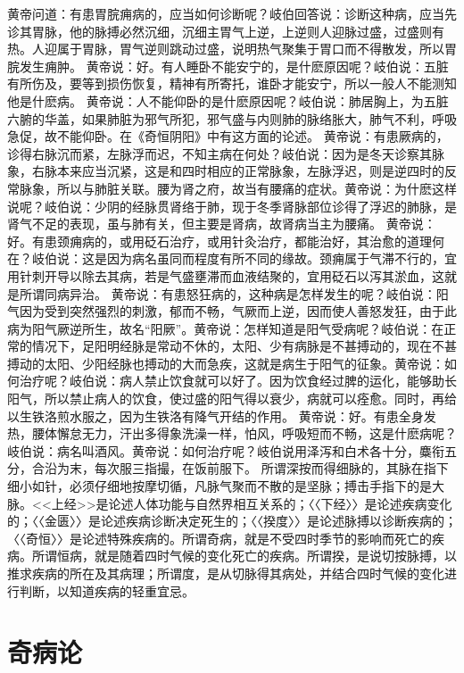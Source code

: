 \documentclass[12pt,UTF8]{ctexbook}
\begin{document}
黄帝问道：有患胃脘痈病的，应当如何诊断呢？岐伯回答说：诊断这种病，应当先诊其胃脉，他的脉搏必然沉细，沉细主胃气上逆，上逆则人迎脉过盛，过盛则有热。人迎属于胃脉，胃气逆则跳动过盛，说明热气聚集于胃口而不得散发，所以胃脘发生痈肿。
黄帝说：好。有人睡卧不能安宁的，是什麽原因呢？岐伯说：五脏有所伤及，要等到损伤恢复，精神有所寄托，谁卧才能安宁，所以一般人不能测知他是什麽病。
黄帝说：人不能仰卧的是什麽原因呢？岐伯说：肺居胸上，为五脏六腑的华盖，如果肺脏为邪气所犯，邪气盛与内则肺的脉络胀大，肺气不利，呼吸急促，故不能仰卧。在《奇恒阴阳》中有这方面的论述。
黄帝说：有患厥病的，诊得右脉沉而紧，左脉浮而迟，不知主病在何处？岐伯说：因为是冬天诊察其脉象，右脉本来应当沉紧，这是和四时相应的正常脉象，左脉浮迟，则是逆四时的反常脉象，所以与肺脏关联。腰为肾之府，故当有腰痛的症状。黄帝说：为什麽这样说呢？岐伯说：少阴的经脉贯肾络于肺，现于冬季肾脉部位诊得了浮迟的肺脉，是肾气不足的表现，虽与肺有关，但主要是肾病，故肾病当主为腰痛。
黄帝说：好。有患颈痈病的，或用砭石治疗，或用针灸治疗，都能治好，其治愈的道理何在？岐伯说：这是因为病名虽同而程度有所不同的缘故。颈痈属于气滞不行的，宜用针刺开导以除去其病，若是气盛壅滞而血液结聚的，宜用砭石以泻其淤血，这就是所谓同病异治。
黄帝说：有患怒狂病的，这种病是怎样发生的呢？岐伯说：阳气因为受到突然强烈的刺激，郁而不畅，气厥而上逆，因而使人善怒发狂，由于此病为阳气厥逆所生，故名“阳厥”。黄帝说：怎样知道是阳气受病呢？岐伯说：在正常的情况下，足阳明经脉是常动不休的，太阳、少有病脉是不甚搏动的，现在不甚搏动的太阳、少阳经脉也搏动的大而急疾，这就是病生于阳气的征象。黄帝说：如何治疗呢？岐伯说：病人禁止饮食就可以好了。因为饮食经过脾的运化，能够助长阳气，所以禁止病人的饮食，使过盛的阳气得以衰少，病就可以痊愈。同时，再给以生铁洛煎水服之，因为生铁洛有降气开结的作用。
黄帝说：好。有患全身发热，腰体懈怠无力，汗出多得象洗澡一样，怕风，呼吸短而不畅，这是什麽病呢？岐伯说：病名叫酒风。黄帝说：如何治疗呢？岐伯说用泽泻和白术各十分，麋衔五分，合沿为末，每次服三指撮，在饭前服下。
所谓深按而得细脉的，其脉在指下细小如针，必须仔细地按摩切循，凡脉气聚而不散的是坚脉；搏击手指下的是大脉。<<上经>>是论述人体功能与自然界相互关系的；〈〈下经〉〉是论述疾病变化的；〈〈金匮〉〉是论述疾病诊断决定死生的；〈〈揆度〉〉是论述脉搏以诊断疾病的；〈〈奇恒〉〉是论述特殊疾病的。所谓奇病，就是不受四时季节的影响而死亡的疾病。所谓恒病，就是随着四时气候的变化死亡的疾病。所谓揆，是说切按脉搏，以推求疾病的所在及其病理；所谓度，是从切脉得其病处，并结合四时气候的变化进行判断，以知道疾病的轻重宜忌。

\chapter{奇病论}
\end{document}
